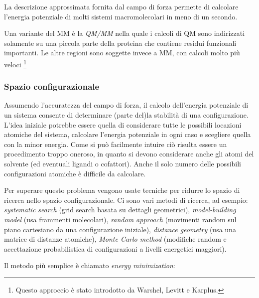 {{\par La descrizione approssimata fornita dal campo di forza permette di calcolare l'energia potenziale di molti sistemi macromolecolari in meno di un secondo. \\

\par Una variante del MM è la \textit{QM/MM} nella quale i calcoli di QM sono indirizzati solamente su una piccola parte della proteina che contiene residui funzionali importanti. Le altre regioni sono soggette invece a MM, con calcoli molto più veloci \footnote{Questo approccio è stato introdotto da Warshel, Levitt e Karplus.}

\subsubsection{Spazio configurazionale}

\par Assumendo l'accuratezza del campo di forza, il calcolo dell'energia potenziale di un sistema consente di determinare (parte del)la stabilità di una configurazione. L'idea iniziale potrebbe essere quella di considerare tutte le possibili locazioni atomiche del sistema, calcolare l'energia potenziale in ogni caso e scegliere quella con la minor energia. Come si può facilmente intuire ciò risulta essere un procedimento troppo oneroso, in quanto si devono considerare anche gli atomi del solvente (ed eventuali ligandi o cofattori). Anche il solo numero delle possibili configurazioni atomiche è difficile da calcolare.

\par Per superare questo problema vengono usate tecniche per ridurre lo spazio di ricerca nello spazio configurazionale. Ci sono vari metodi di ricerca, ad esempio: \textit{systematic search }(grid search basata su dettagli geometrici), \textit{model-building model }(usa frammenti molecolari), \textit{random approach }(movimenti random sul piano cartesiano da una configurazione iniziale), \textit{distance geometry} (usa una matrice di distanze atomiche), \textit{Monte Carlo method} (modifiche random e accettazione probabilistica di configurazioni a livelli energetici maggiori)\supercite{ROY2015151}.

\par Il metodo più semplice è chiamato \textit{energy minimization}:

}}
